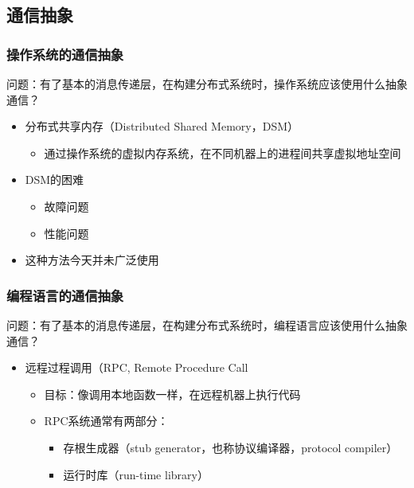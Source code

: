 \subsection{通信抽象} %
\begin{frame}[fragile]
    \frametitle{操作系统的通信抽象}
    问题：有了基本的消息传递层，在构建分布式系统时，操作系统应该使用什么抽象通信？\pause
    \begin{itemize}
        \item 分布式共享内存（Distributed Shared Memory，DSM）
        \begin{itemize}
            \item 通过操作系统的虚拟内存系统，在不同机器上的进程间共享虚拟地址空间
        \end{itemize} \pause
            \item DSM的困难
        \begin{itemize}
            \item 故障问题
            \item 性能问题
        \end{itemize}
            \item 这种方法今天并未广泛使用
    \end{itemize}
    
\end{frame}

\begin{frame}[fragile]
    \frametitle{编程语言的通信抽象}
    问题：有了基本的消息传递层，在构建分布式系统时，编程语言应该使用什么抽象通信？
    \begin{itemize}
        \item 远程过程调用（RPC, Remote Procedure Call \pause
        \begin{itemize}
            \item 目标：像调用本地函数一样，在远程机器上执行代码
            \item RPC系统通常有两部分：
            \begin{itemize}
                \item  存根生成器（stub generator，也称协议编译器，protocol compiler）
                \item 运行时库（run-time library）
            \end{itemize}
        \end{itemize}
    \end{itemize}
    
\end{frame}

